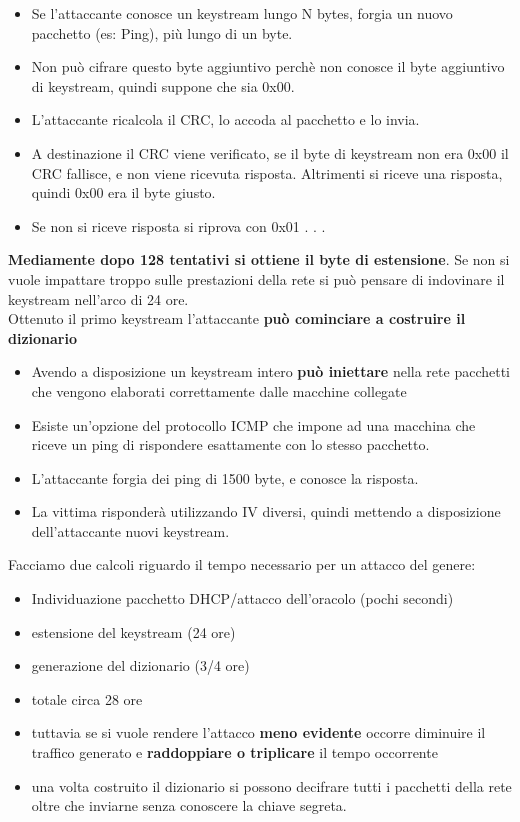 \documentclass[12pt]{article}
\begin{document}
				\begin{itemize}
					\item  Se l’attaccante conosce un keystream lungo N bytes, forgia
					un nuovo pacchetto (es: Ping), più lungo di un byte.
					\item Non può cifrare questo byte aggiuntivo perchè non conosce
					il byte aggiuntivo di keystream, quindi suppone che sia
					0x00.
					\item L’attaccante ricalcola il CRC, lo accoda al pacchetto e lo
					invia.
					\item A destinazione il CRC viene verificato, se il byte di
					keystream non era 0x00 il CRC fallisce, e non viene ricevuta
					risposta. Altrimenti si riceve una risposta, quindi 0x00 era il
					byte giusto.
					\item Se non si riceve risposta si riprova con 0x01 . . .	
				\end{itemize}
				\textbf{Mediamente dopo 128 tentativi si ottiene il byte di estensione}. Se non si vuole impattare troppo sulle prestazioni della rete si può pensare di indovinare il keystream nell'arco di 24 ore.\\
				Ottenuto il primo keystream l'attaccante \textbf{può cominciare a costruire il dizionario}
				\begin{itemize}
					\item  Avendo a disposizione un
					keystream intero \textbf{può iniettare} nella rete pacchetti
					che vengono elaborati correttamente dalle macchine collegate
					\item Esiste un’opzione del protocollo ICMP che impone ad una
					macchina che riceve un ping di rispondere esattamente
					con lo stesso pacchetto.
					\item L’attaccante forgia dei ping di 1500 byte, e conosce la
					risposta.
					\item La vittima risponderà utilizzando IV diversi, quindi
					mettendo a disposizione dell’attaccante nuovi keystream.
				\end{itemize}
				Facciamo due calcoli riguardo il tempo necessario per un attacco del genere:
				\begin{itemize}
					\item Individuazione pacchetto DHCP/attacco dell'oracolo (pochi secondi)
					\item estensione del keystream (24 ore)
					\item generazione del dizionario (3/4 ore)
					\item totale circa 28 ore
					\item tuttavia se si vuole rendere l'attacco \textbf{meno evidente} occorre diminuire il traffico generato e \textbf{raddoppiare o triplicare} il tempo occorrente
					\item una volta costruito il dizionario si possono decifrare tutti i pacchetti della rete oltre che inviarne senza conoscere la chiave segreta.
				\end{itemize}
\end{document}
